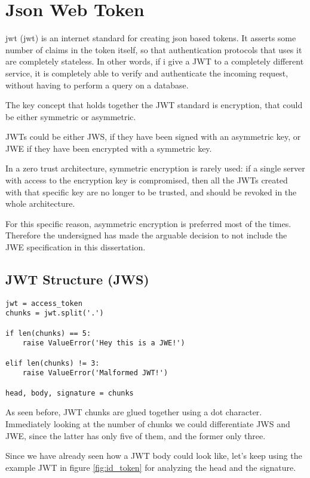 \section{Json Web Token}
\label{jwt}
\acs{jwt} (\acl{jwt}) is an internet standard for creating \acs{json} based tokens.
It asserts some number of claims in the token itself, so that authentication
protocols that uses it are completely stateless.
In other words, if i give a JWT to a completely different service, it is
completely able to verify and authenticate the incoming request, without having
to perform a query on a database.

The key concept that holds together the JWT standard is encryption, that could
be either symmetric or asymmetric.

JWTs could be either JWS, if they have been signed with an asymmetric key, or JWE
if they have been encrypted with a symmetric key.

In a zero trust architecture, symmetric encryption is rarely used: if a
single server with access to the encryption key is compromised, then all the
JWTs created with that specific key are no longer to be trusted, and should be revoked
in the whole architecture.

For this specific reason, asymmetric encryption is preferred most of the times.
Therefore the undersigned has made the arguable decision to not include the JWE
specification in this dissertation.

\subsection{JWT Structure (JWS)}
\begin{lstlisting}
jwt = access_token
chunks = jwt.split('.')

if len(chunks) == 5:
    raise ValueError('Hey this is a JWE!')

elif len(chunks) != 3:
    raise ValueError('Malformed JWT!')

head, body, signature = chunks
\end{lstlisting}

As seen before, JWT chunks are glued together using a dot character.
Immediately looking at the number of chunks we could differentiate JWS and JWE,
since the latter has only five of them, and the former only three.

Since we have already seen how a JWT body could look like, let's keep using the example JWT
in figure \ref{fig:id_token} for analyzing the head and the signature.

